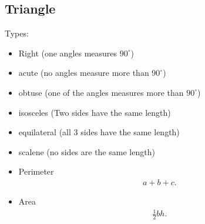 \documentclass{report}
\begin{document}
    \bigbreak \noindent \bigbreak \noindent 
    \subsection{Triangle}
    \bigbreak \noindent 
    Types:
    \begin{itemize}
      \item Right (one angles measures $90^{\circ}$)
      \item acute (no angles measure more than $90^{\circ} $)
      \item obtuse (one of the angles measures more than $90^{\circ} $)
      \item isosceles (Two sides have the same length)
      \item equilateral (all 3 sides have the same length)
      \item scalene (no sides are the same length)
    \end{itemize}
    \begin{itemize}
      \item Perimeter
        \begin{align*}
          a + b + c
        .\end{align*}
      \item Area
        \begin{align*}
          \frac{1}{2}bh
        .\end{align*}
    \end{itemize}

    \bigbreak \noindent \bigbreak \noindent 
\end{document}
